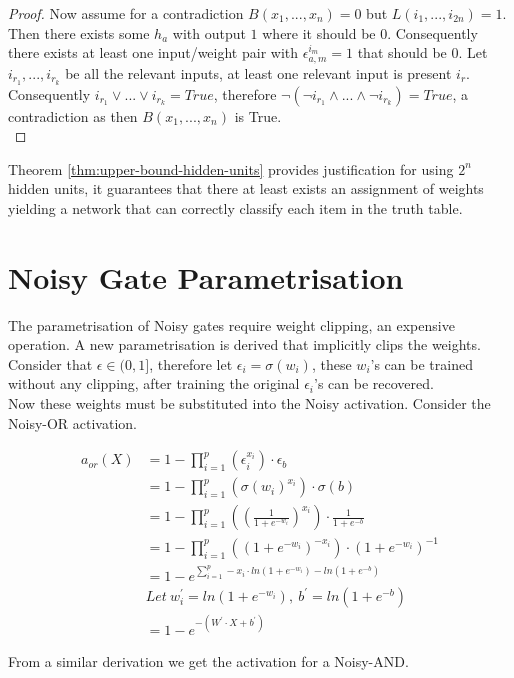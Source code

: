 \begin{proof}
Now assume for a contradiction $B(x_1, ..., x_n) = 0$ but $L(i_1, ..., i_{2n}) = 1$. Then there exists some $h_a$ with output $1$ where it should be $0$. Consequently there exists at least one input/weight pair with $\epsilon_{a,m}^{i_m} = 1$ that should be $0$. Let $i_{r_1}, ..., i_{r_k}$ be all the relevant inputs, at least one relevant input is present $i_r$. Consequently $i_{r_1} \lor ... \lor i_{r_k} = True$, therefore $\lnot(\lnot i_{r_1} \land ... \land \lnot i_{r_k}) = True$, a contradiction as then $B(x_1, ..., x_n)$ is True.\\
\end{proof}

Theorem \ref{thm:upper-bound-hidden-units} provides justification for using $2^n$ hidden units, it guarantees that there at least exists an assignment of weights yielding a network that can correctly classify each item in the truth table.

\section{Noisy Gate Parametrisation} 
The parametrisation of Noisy gates require weight clipping, an expensive operation. A new parametrisation is derived that implicitly clips the weights. Consider that $\epsilon \in (0, 1]$, therefore let $\epsilon_i = \sigma(w_i)$, these $w_i$'s can be trained without any clipping, after training the original $\epsilon_i$'s can be recovered.\\

Now these weights must be substituted into the Noisy activation. Consider the Noisy-OR activation.

\begin{align*}
a_{or}(X) &= 1 - \prod^p_{i=1}(\epsilon_i^{x_i}) \cdot \epsilon_b\\
&= 1 - \prod^p_{i=1}(\sigma(w_i)^{x_i}) \cdot \sigma(b)\\
&= 1 - \prod^p_{i=1}((\frac{1}{1 + e^{-w_i}})^{x_i}) \cdot \frac{1}{1 + e^{-b}}\\
&= 1 - \prod^p_{i=1}((1 + e^{-w_i})^{-x_i}) \cdot (1 + e^{-w_i})^{-1}\\
&= 1 - e^{\sum^p_{i=1} -x_i \cdot ln(1 + e^{-w_i}) - ln(1 + e^{-b})} \\
&Let\ w_i^{'} = ln(1 + e^{-w_i}),\ b^{'} = ln(1 + e^{-b})\\
&= 1 - e^{-(W^{'} \cdot X + b^{'})}
\end{align*}

From a similar derivation we get the activation for a Noisy-AND.

